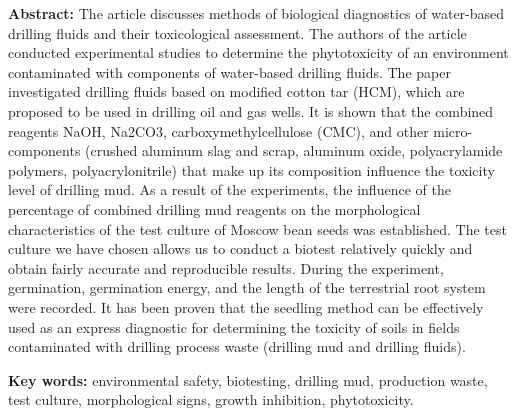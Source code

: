 {\bfseries Abstract:} The article discusses methods of biological
diagnostics of water-based drilling fluids and their toxicological
assessment. The authors of the article conducted experimental studies to
determine the phytotoxicity of an environment contaminated with
components of water-based drilling fluids. The paper investigated
drilling fluids based on modified cotton tar (HCM), which are proposed
to be used in drilling oil and gas wells. It is shown that the combined
reagents NaOH, Na2CO3, carboxymethylcellulose (CMC), and other
micro-components (crushed aluminum slag and scrap, aluminum oxide,
polyacrylamide polymers, polyacrylonitrile) that make up its composition
influence the toxicity level of drilling mud. As a result of the
experiments, the influence of the percentage of combined drilling mud
reagents on the morphological characteristics of the test culture of
Moscow bean seeds was established. The test culture we have chosen
allows us to conduct a biotest relatively quickly and obtain fairly
accurate and reproducible results. During the experiment, germination,
germination energy, and the length of the terrest\-rial root system were
recorded. It has been proven that the seedling method can be effectively
used as an express diagnostic for determining the toxicity of soils in
fields contaminated with drilling process waste (drilling mud and
drilling fluids).

{\bfseries Key words:} environmental safety, biotesting, drilling mud,
production waste, test culture, morphologi\-cal signs, growth inhibition,
phytotoxicity.

